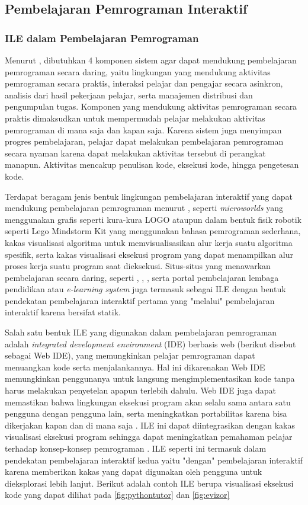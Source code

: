 \subsection{Pembelajaran Pemrograman Interaktif}
\subsubsection{ILE dalam Pembelajaran Pemrograman}
Menurut \textcite{choy2004interactive}, dibutuhkan 4 komponen sistem agar dapat mendukung pembelajaran pemrograman secara daring, yaitu lingkungan yang mendukung aktivitas pemrograman secara praktis, interaksi pelajar dan pengajar secara asinkron, analisis dari hasil pekerjaan pelajar, serta manajemen distribusi dan pengumpulan tugas. Komponen yang mendukung aktivitas pemrograman secara praktis dimaksudkan untuk mempermudah pelajar melakukan aktivitas pemrograman di mana saja dan kapan saja. Karena sistem juga menyimpan progres pembelajaran, pelajar dapat melakukan pembelajaran pemrograman secara nyaman karena dapat melakukan aktivitas tersebut di perangkat manapun. Aktivitas mencakup penulisan kode, eksekusi kode, hingga pengetesan kode.

Terdapat beragam jenis bentuk lingkungan pembelajaran interaktif yang dapat mendukung pembelajaran pemrograman menurut \textcite{moons2013pilot}, seperti \textit{microworlds} yang menggunakan grafis seperti kura-kura LOGO ataupun dalam bentuk fisik robotik seperti Lego Mindstorm Kit yang menggunakan bahasa pemrograman sederhana, kakas visualisasi algoritma untuk memvisualisasikan alur kerja suatu algoritma spesifik, serta kakas visualisasi eksekusi program yang dapat menampilkan alur proses kerja suatu program saat dieksekusi. Situs-situs yang menawarkan pembelajaran secara daring, seperti \textcite{sololearn2021media}, \textcite{codesaya2021media}, \textcite{brilliant2021media}, serta portal pembelajaran lembaga pendidikan atau \textit{e-learning system} juga termasuk sebagai ILE dengan bentuk pendekatan pembelajaran interaktif pertama yang "melalui" pembelajaran interaktif karena bersifat statik.

Salah satu bentuk ILE yang digunakan dalam pembelajaran pemrograman adalah \textit{integrated development environment} (IDE) berbasis web (berikut disebut sebagai Web IDE), yang memungkinkan pelajar pemrograman dapat menuangkan kode serta menjalankannya. Hal ini dikarenakan Web IDE memungkinkan penggunanya untuk langsung mengimplementasikan kode tanpa harus melakukan penyetelan apapun terlebih dahulu. Web IDE juga dapat memastikan bahwa lingkungan eksekusi program akan selalu sama antara satu pengguna dengan pengguna lain, serta meningkatkan portabilitas karena bisa dikerjakan kapan dan di mana saja \parencite{tran2013interactive}. ILE ini dapat diintegrasikan dengan kakas visualisasi eksekusi program sehingga dapat meningkatkan pemahaman pelajar terhadap konsep-konsep pemrograman \parencite{moons2013pilot}. ILE seperti ini termasuk dalam pendekatan pembelajaran interaktif kedua yaitu "dengan" pembelajaran interaktif karena memberikan kakas yang dapat digunakan oleh pengguna untuk dieksplorasi lebih lanjut. Berikut adalah contoh ILE berupa visualisasi eksekusi kode yang dapat dilihat pada \autoref{fig:pythontutor} dan \autoref{fig:evizor}

